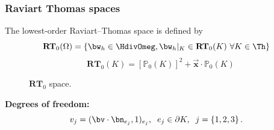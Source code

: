 \documentclass[10 pt]{beamer}
\begin{document}
\begin{frame}
\frametitle{Raviart Thomas spaces}
\vspace{-0.3 cm}
\begin{definition}
The lowest-order Raviart--Thomas space is defined by
\begin{equation*}
\textbf{RT}_0(\Omega)=\left\{\bw_h \in \HdivOmeg, {\bw_h}|_{K} \in \textbf{RT}_0(K)\ \forall K \in \Th\right\}
\end{equation*}
 \begin{equation*}
 \quad \textbf{RT}_0(K)=[{\mathbb{P}}_0(K)]^2 + \vec{{\bm x}} \cdot  {\mathbb{P}}_0(K)
\end{equation*}
\end{definition}
\begin{minipage}[c]{0.5 \linewidth}
\begin{figure}
\centering
{}
\caption{$\textbf{RT}_0$ space.}
\label{ref:fig:RT0}
\end{figure}
\end{minipage}\hfill
\begin{minipage}[c]{0.5 \linewidth}
\textcolor{cadmiumgreen}{\textbf{Degrees of freedom:}} 
\begin{equation*}
v_j=(\bv \cdot \bn_{e_j},1)_{e_j}, \hspace{0.2 cm} e_j \in \partial K, \hspace{0.2 cm} j = \left\{1,2,3\right\}.
\end{equation*}
\end{minipage}

\end{frame}
\end{document}
